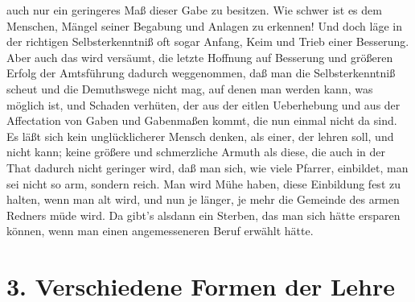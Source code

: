 auch nur ein geringeres Maß dieser Gabe zu besitzen. Wie schwer ist es dem Menschen, Mängel seiner Begabung und Anlagen zu erkennen! Und doch läge in der richtigen Selbsterkenntniß oft sogar Anfang, Keim und Trieb einer Besserung. Aber auch das wird versäumt, die letzte Hoffnung auf Besserung und größeren Erfolg der Amtsführung dadurch weggenommen, daß man die Selbsterkenntniß scheut und die Demuthswege nicht mag, auf denen man werden kann, was möglich ist, und Schaden verhüten, der aus der eitlen Ueberhebung und aus der Affectation von Gaben und Gabenmaßen kommt, die nun einmal nicht da sind. Es läßt sich kein unglücklicherer Mensch denken, als einer, der lehren soll, und nicht kann; keine größere und schmerzliche Armuth als diese, die auch in der That dadurch nicht geringer wird, daß man sich, wie viele Pfarrer, einbildet, man sei nicht so arm, sondern reich. Man wird Mühe haben, diese Einbildung fest zu halten, wenn man alt wird, und nun je länger, je mehr die Gemeinde des armen Redners müde wird. Da gibt's alsdann ein Sterben, das man sich hätte ersparen können, wenn man einen angemesseneren Beruf erwählt hätte.

\section{3. Verschiedene Formen der Lehre}

